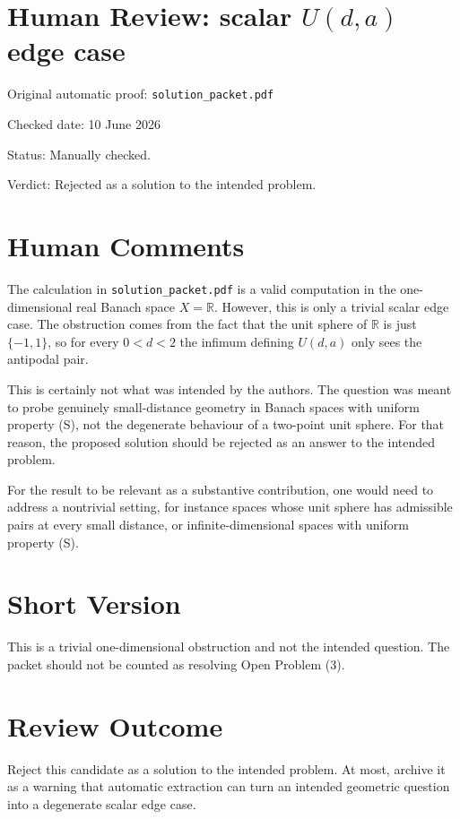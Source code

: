 \documentclass[11pt]{article}
\begin{document}
\section*{Human Review: scalar \texorpdfstring{$U(d,a)$}{U(d,a)} edge case}

\noindent Original automatic proof: \texttt{solution\_packet.pdf}

\noindent Checked date: 10 June 2026

\noindent Status: Manually checked.

\noindent Verdict: Rejected as a solution to the intended problem.

\section*{Human Comments}

The calculation in \texttt{solution\_packet.pdf} is a valid computation in the
one-dimensional real Banach space \(X=\mathbb R\). However, this is only a
trivial scalar edge case. The obstruction comes from the fact that the unit
sphere of \(\mathbb R\) is just \(\{-1,1\}\), so for every \(0<d<2\) the
infimum defining \(U(d,a)\) only sees the antipodal pair.

This is certainly not what was intended by the authors. The question was
meant to probe genuinely small-distance geometry in Banach spaces with
uniform property (S), not the degenerate behaviour of a two-point unit sphere.
For that reason, the proposed solution should be rejected as an answer to the
intended problem.

For the result to be relevant as a substantive contribution, one would need
to address a nontrivial setting, for instance spaces whose unit sphere has
admissible pairs at every small distance, or infinite-dimensional spaces with
uniform property (S).

\section*{Short Version}

This is a trivial one-dimensional obstruction and not the intended question.
The packet should not be counted as resolving Open Problem (3).

\section*{Review Outcome}

Reject this candidate as a solution to the intended problem. At most, archive
it as a warning that automatic extraction can turn an intended geometric
question into a degenerate scalar edge case.
\end{document}
